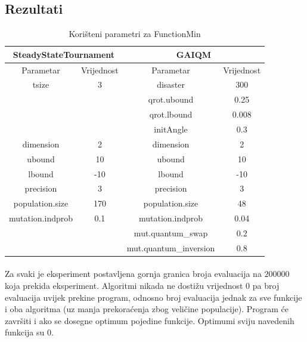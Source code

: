 \documentclass[times, utf8, zavrsni, numeric]{fer}
\begin{document}
\subsection{Rezultati}
\begin{table}[htb]
\caption{Korišteni parametri za FunctionMin}
\centering
\begin{tabular}{|c|c||c|c|} \hline
\multicolumn{2}{|c||}{SteadyStateTournament} & \multicolumn{2}{c|}{GAIQM} \\ 
\hline
Parametar & Vrijednost & Parametar & Vrijednost \\ 
\hline
tsize & 3 & disaster & 300 \\
&& qrot.ubound & 0.25 \\
&& qrot.lbound & 0.008 \\
&& initAngle & 0.3 \\
dimension & 2 & dimension & 2 \\
ubound & 10 & ubound & 10 \\
lbound & -10 & lbound & -10 \\
precision & 3 & precision & 3 \\
population.size & 170 & population.size & 48 \\
mutation.indprob & 0.1 & mutation.indprob & 0.04 \\
&& mut.quantum\_swap & 0.2 \\
&& mut.quantum\_inversion & 0.8 \\
\hline
\end{tabular}
\end{table}

\paragraph{}
Za svaki je eksperiment postavljena gornja granica broja evaluacija na $200000$ koja prekida eksperiment. Algoritmi nikada ne dostižu vrijednost $0$ pa broj evaluacija uvijek prekine program, odnosno broj evaluacija jednak za sve funkcije i oba algoritma (uz manja prekoraćenja zbog veličine populacije). Program će završiti i ako se dosegne optimum pojedine funkcije. Optimumi sviju navedenih funkcija su $0$.
\end{document}
